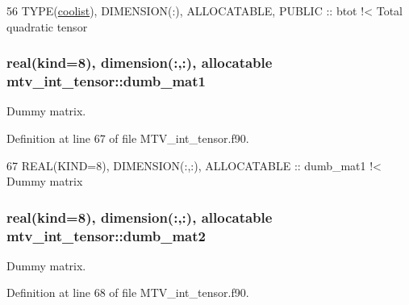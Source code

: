\begin{DoxyCode}
56   \textcolor{keywordtype}{TYPE}(\hyperlink{structtensor_1_1coolist}{coolist}), \textcolor{keywordtype}{DIMENSION(:)}, \textcolor{keywordtype}{ALLOCATABLE}, \textcolor{keywordtype}{PUBLIC} :: btot\textcolor{comment}{ !< Total quadratic tensor}
\end{DoxyCode}
\subsubsection[{\texorpdfstring{dumb\+\_\+mat1}{dumb_mat1}}]{\setlength{\rightskip}{0pt plus 5cm}real(kind=8), dimension(\+:,\+:), allocatable mtv\+\_\+int\+\_\+tensor\+::dumb\+\_\+mat1\hspace{0.3cm}{\ttfamily [private]}}\hypertarget{namespacemtv__int__tensor_a6b350b05230b163e36094160758f2ee8}{}\label{namespacemtv__int__tensor_a6b350b05230b163e36094160758f2ee8}


Dummy matrix. 



Definition at line 67 of file M\+T\+V\+\_\+int\+\_\+tensor.\+f90.


\begin{DoxyCode}
67   \textcolor{keywordtype}{REAL(KIND=8)}, \textcolor{keywordtype}{DIMENSION(:,:)}, \textcolor{keywordtype}{ALLOCATABLE} :: dumb\_mat1\textcolor{comment}{ !< Dummy matrix}
\end{DoxyCode}
\subsubsection[{\texorpdfstring{dumb\+\_\+mat2}{dumb_mat2}}]{\setlength{\rightskip}{0pt plus 5cm}real(kind=8), dimension(\+:,\+:), allocatable mtv\+\_\+int\+\_\+tensor\+::dumb\+\_\+mat2\hspace{0.3cm}{\ttfamily [private]}}\hypertarget{namespacemtv__int__tensor_a3c9c33307f4589ac4fecf901333721fd}{}\label{namespacemtv__int__tensor_a3c9c33307f4589ac4fecf901333721fd}


Dummy matrix. 



Definition at line 68 of file M\+T\+V\+\_\+int\+\_\+tensor.\+f90.


